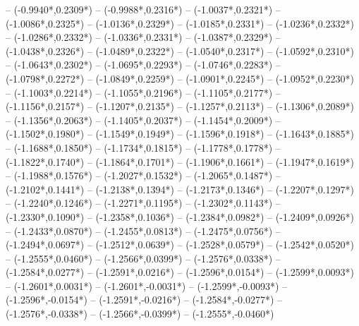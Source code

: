 {	-- ({-0.9940*\dx},{0.2309*\dy})
	-- ({-0.9988*\dx},{0.2316*\dy})
	-- ({-1.0037*\dx},{0.2321*\dy})
	-- ({-1.0086*\dx},{0.2325*\dy})
	-- ({-1.0136*\dx},{0.2329*\dy})
	-- ({-1.0185*\dx},{0.2331*\dy})
	-- ({-1.0236*\dx},{0.2332*\dy})
	-- ({-1.0286*\dx},{0.2332*\dy})
	-- ({-1.0336*\dx},{0.2331*\dy})
	-- ({-1.0387*\dx},{0.2329*\dy})
	-- ({-1.0438*\dx},{0.2326*\dy})
	-- ({-1.0489*\dx},{0.2322*\dy})
	-- ({-1.0540*\dx},{0.2317*\dy})
	-- ({-1.0592*\dx},{0.2310*\dy})
	-- ({-1.0643*\dx},{0.2302*\dy})
	-- ({-1.0695*\dx},{0.2293*\dy})
	-- ({-1.0746*\dx},{0.2283*\dy})
	-- ({-1.0798*\dx},{0.2272*\dy})
	-- ({-1.0849*\dx},{0.2259*\dy})
	-- ({-1.0901*\dx},{0.2245*\dy})
	-- ({-1.0952*\dx},{0.2230*\dy})
	-- ({-1.1003*\dx},{0.2214*\dy})
	-- ({-1.1055*\dx},{0.2196*\dy})
	-- ({-1.1105*\dx},{0.2177*\dy})
	-- ({-1.1156*\dx},{0.2157*\dy})
	-- ({-1.1207*\dx},{0.2135*\dy})
	-- ({-1.1257*\dx},{0.2113*\dy})
	-- ({-1.1306*\dx},{0.2089*\dy})
	-- ({-1.1356*\dx},{0.2063*\dy})
	-- ({-1.1405*\dx},{0.2037*\dy})
	-- ({-1.1454*\dx},{0.2009*\dy})
	-- ({-1.1502*\dx},{0.1980*\dy})
	-- ({-1.1549*\dx},{0.1949*\dy})
	-- ({-1.1596*\dx},{0.1918*\dy})
	-- ({-1.1643*\dx},{0.1885*\dy})
	-- ({-1.1688*\dx},{0.1850*\dy})
	-- ({-1.1734*\dx},{0.1815*\dy})
	-- ({-1.1778*\dx},{0.1778*\dy})
	-- ({-1.1822*\dx},{0.1740*\dy})
	-- ({-1.1864*\dx},{0.1701*\dy})
	-- ({-1.1906*\dx},{0.1661*\dy})
	-- ({-1.1947*\dx},{0.1619*\dy})
	-- ({-1.1988*\dx},{0.1576*\dy})
	-- ({-1.2027*\dx},{0.1532*\dy})
	-- ({-1.2065*\dx},{0.1487*\dy})
	-- ({-1.2102*\dx},{0.1441*\dy})
	-- ({-1.2138*\dx},{0.1394*\dy})
	-- ({-1.2173*\dx},{0.1346*\dy})
	-- ({-1.2207*\dx},{0.1297*\dy})
	-- ({-1.2240*\dx},{0.1246*\dy})
	-- ({-1.2271*\dx},{0.1195*\dy})
	-- ({-1.2302*\dx},{0.1143*\dy})
	-- ({-1.2330*\dx},{0.1090*\dy})
	-- ({-1.2358*\dx},{0.1036*\dy})
	-- ({-1.2384*\dx},{0.0982*\dy})
	-- ({-1.2409*\dx},{0.0926*\dy})
	-- ({-1.2433*\dx},{0.0870*\dy})
	-- ({-1.2455*\dx},{0.0813*\dy})
	-- ({-1.2475*\dx},{0.0756*\dy})
	-- ({-1.2494*\dx},{0.0697*\dy})
	-- ({-1.2512*\dx},{0.0639*\dy})
	-- ({-1.2528*\dx},{0.0579*\dy})
	-- ({-1.2542*\dx},{0.0520*\dy})
	-- ({-1.2555*\dx},{0.0460*\dy})
	-- ({-1.2566*\dx},{0.0399*\dy})
	-- ({-1.2576*\dx},{0.0338*\dy})
	-- ({-1.2584*\dx},{0.0277*\dy})
	-- ({-1.2591*\dx},{0.0216*\dy})
	-- ({-1.2596*\dx},{0.0154*\dy})
	-- ({-1.2599*\dx},{0.0093*\dy})
	-- ({-1.2601*\dx},{0.0031*\dy})
	-- ({-1.2601*\dx},{-0.0031*\dy})
	-- ({-1.2599*\dx},{-0.0093*\dy})
	-- ({-1.2596*\dx},{-0.0154*\dy})
	-- ({-1.2591*\dx},{-0.0216*\dy})
	-- ({-1.2584*\dx},{-0.0277*\dy})
	-- ({-1.2576*\dx},{-0.0338*\dy})
	-- ({-1.2566*\dx},{-0.0399*\dy})
	-- ({-1.2555*\dx},{-0.0460*\dy})
}
